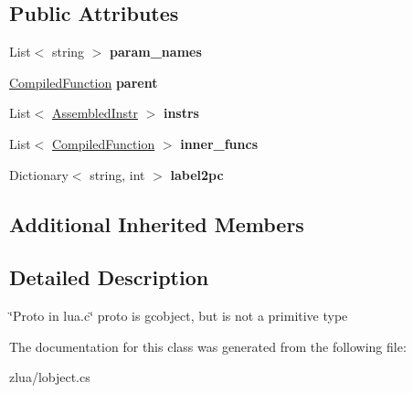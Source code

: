 \subsection*{Public Attributes}
\begin{DoxyCompactItemize}
\item 
\mbox{\label{classzlua_1_1_lua_1_1_compiled_function_aced124a626e6e66da9d2bbd03cb5cd1b}} 
List$<$ string $>$ {\bfseries param\+\_\+names}
\item 
\mbox{\label{classzlua_1_1_lua_1_1_compiled_function_a5a2b11130a27a3efde8b41ffd07ee029}} 
\mbox{\hyperlink{classzlua_1_1_lua_1_1_compiled_function}{Compiled\+Function}} {\bfseries parent}
\item 
\mbox{\label{classzlua_1_1_lua_1_1_compiled_function_ab5740c8dbea8bd8b8439cd40f8b06151}} 
List$<$ \mbox{\hyperlink{classzlua_1_1_lua_1_1_assembled_instr}{Assembled\+Instr}} $>$ {\bfseries instrs}
\item 
\mbox{\label{classzlua_1_1_lua_1_1_compiled_function_a4941bbbce70fa669ac532bc27b0ebe05}} 
List$<$ \mbox{\hyperlink{classzlua_1_1_lua_1_1_compiled_function}{Compiled\+Function}} $>$ {\bfseries inner\+\_\+funcs}
\item 
\mbox{\label{classzlua_1_1_lua_1_1_compiled_function_a76ab5e462e9c9f2d4236b19ec19403c3}} 
Dictionary$<$ string, int $>$ {\bfseries label2pc}
\end{DoxyCompactItemize}
\subsection*{Additional Inherited Members}


\subsection{Detailed Description}
\char`\"{}\+Proto in lua.\+c\char`\"{} proto is gcobject, but is not a primitive type 



The documentation for this class was generated from the following file\+:\begin{DoxyCompactItemize}
\item 
zlua/lobject.\+cs\end{DoxyCompactItemize}
